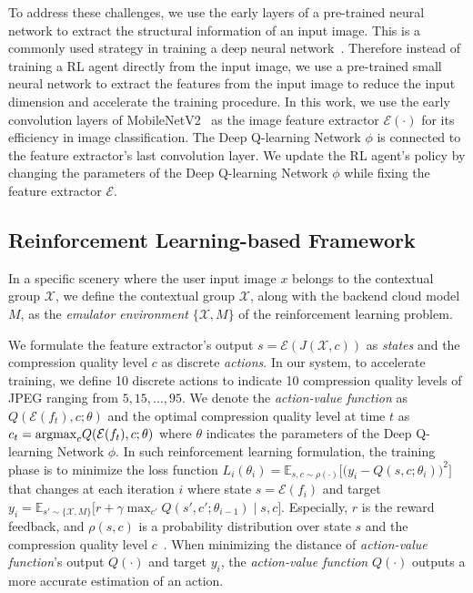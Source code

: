 To address these challenges, we use the early layers of a pre-trained neural network to extract the structural information of an input image. This is a commonly used strategy in training a deep neural network~\cite{finetunning,finetunning2}. Therefore instead of training a RL agent directly from the input image, we use a pre-trained small neural network to extract the features from the input image to reduce the input dimension and accelerate the training procedure. In this work, we use the early convolution layers of MobileNetV2~\cite{MobileNetV2} as the image feature extractor $ \mathcal{E}(\cdot) $ for its efficiency in image classification. The Deep Q-learning Network $ \phi $ is connected to the feature extractor's last convolution layer. We update the RL agent's policy by changing the parameters of the Deep Q-learning Network $ \phi $ while fixing the feature extractor $ \mathcal{E} $. %

\subsection{Reinforcement Learning-based Framework}

In a specific scenery where the user input image $ x $ belongs to the contextual group $ \mathcal{X} $, we define the contextual group $ \mathcal{X} $, along with the backend cloud model $ M $, as the \emph{emulator environment} $ \{\mathcal{X}, M\} $ of the reinforcement learning problem. 

We formulate the feature extractor's output {\color{revise2} $ s = \mathcal{E}(J(\mathcal{X}, c)) $} as \emph{states} and the compression quality level $ c $ as discrete \emph{actions}. In our system, to accelerate training, we define 10 discrete actions to indicate 10 compression quality levels of JPEG ranging from $ 5, 15, ...,95 $. We denote the \emph{action-value function} as {\color{revise2} $ Q(\mathcal{E}(f_t), c; \theta) $} and the optimal compression quality level at time $ t $ as {\color{revise2} $  c_t = {\rm argmax}_cQ(\mathcal{E}(f_t), c; \theta) $} where $ \theta $ indicates the parameters of the Deep Q-learning Network $ \phi $. In such reinforcement learning formulation, the training phase is to minimize the loss function $ L_i(\theta_i) = \mathbb{E}_{s, c \sim \rho (\cdot)}\Big[\big(y_i - Q(s, c; \theta_i)\big)^2 \Big] $ that changes at each iteration $ i $ where {\color{revise2} state $ s = \mathcal{E}(f_i) $} and target $ y_i = \mathbb{E}_{s' \sim \{\mathcal{X}, M\}} \big[ r + \gamma \max_{c'} Q(s', c'; \theta_{i-1}) \mid s, c \big] $. Especially, $ r $ is the reward feedback, and $ \rho(s, c) $ is a probability distribution over {\color{revise2} state} $ s $ and the compression quality level $ c $~\cite{DQN}. When minimizing the distance of \emph{action-value function}'s output $ Q(\cdot) $ and target $ y_i $, the \emph{action-value function} $ Q(\cdot) $ outputs a more accurate estimation of an action. 

